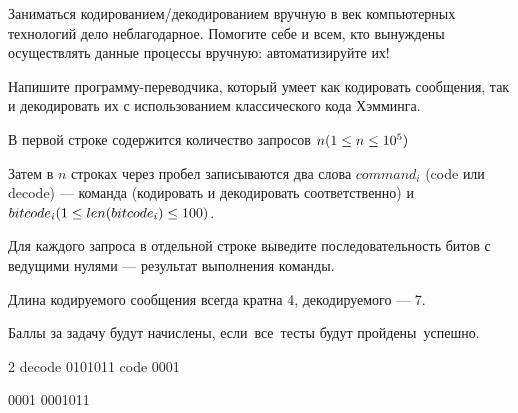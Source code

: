 
Заниматься кодированием/декодированием вручную в век компьютерных технологий дело неблагодарное. Помогите себе и всем, кто вынуждены осуществлять данные процессы вручную: автоматизируйте их!

Напишите программу-переводчика, который умеет как кодировать сообщения, так и декодировать их с использованием классического кода Хэмминга.


В первой строке содержится количество запросов $n\space (1\leq n \leq 10^5) $

Затем в $n$ строках через пробел записываются два слова $command_i$ (code или decode) — команда (кодировать и декодировать соответственно) и \\ $ bitcode_i\space (1\leq len(bitcode_i) \leq 100)$.

\outputfmtSection

Для каждого запроса в отдельной строке выведите последовательность битов с ведущими нулями — результат выполнения команды.

\explanationSection

Длина кодируемого сообщения всегда кратна 4, декодируемого — 7.

\markSection

Баллы за задачу будут начислены, если все тесты будут пройдены успешно.


\begin{myverbbox}[\small]{\vinput}
    2
    decode 0101011
    code 0001
\end{myverbbox}
\begin{myverbbox}[\small]{\voutput}
    0001
    0001011
\end{myverbbox}

